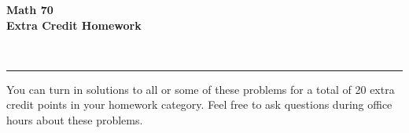\documentclass[11pt]{amsart}
\newcommand{\HRule}{\rule{\linewidth}{0.5mm}}
\begin{document}
\begin{minipage}{0.4\textwidth}
\begin{flushleft} \large
 \textsc{}
\end{flushleft}
\end{minipage}
\begin{minipage}{0.6\textwidth}
\begin{flushright} \Large
{\bf Math 70  \\
Extra Credit Homework}
\end{flushright}
\end{minipage}\\

\HRule

You can turn in solutions to all or some of these problems for a total of 20 extra credit points in your homework category.  
Feel free to ask questions during office hours about these problems. 
\end{document}
